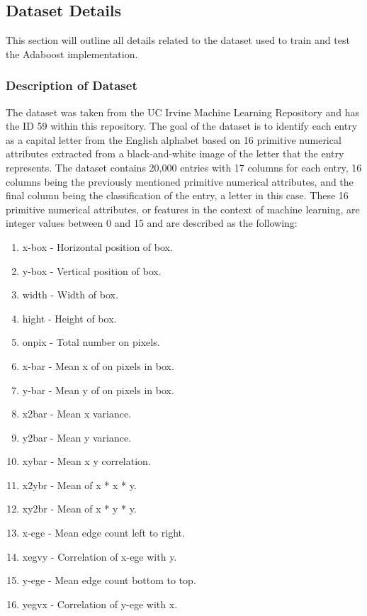\documentclass[a4paper]{article}
\begin{document}
\newpage

\subsection{Dataset Details}
This section will outline all details related to the dataset used to train and test the Adaboost implementation. 

\subsubsection{Description of Dataset}
The dataset was taken from the UC Irvine Machine Learning Repository and has the ID 59 within this repository. The goal of the dataset is to identify each entry as a capital letter from the English alphabet based on 16 primitive numerical attributes extracted from a black-and-white image of the letter that the entry represents. The dataset contains 20,000 entries with 17 columns for each entry, 16 columns being the previously mentioned primitive numerical attributes, and the final column being the classification of the entry, a letter in this case. These 16 primitive numerical attributes, or features in the context of machine learning, are integer values between 0 and 15 and are described as the following:
\begin{enumerate}
    \item x-box - Horizontal position of box.
    \item y-box - Vertical position of box.
    \item width - Width of box.
    \item hight - Height of box.
    \item onpix - Total number on pixels.
    \item x-bar - Mean x of on pixels in box.
    \item y-bar - Mean y of on pixels in box.
    \item x2bar - Mean x variance.
    \item y2bar - Mean y variance.
    \item xybar - Mean x y correlation.
    \item x2ybr - Mean of x * x * y.
    \item xy2br - Mean of x * y * y.
    \item x-ege - Mean edge count left to right.
    \item xegvy - Correlation of x-ege with y.
    \item y-ege - Mean edge count bottom to top.
    \item yegvx - Correlation of y-ege with x.
\end{enumerate}
\end{document}
